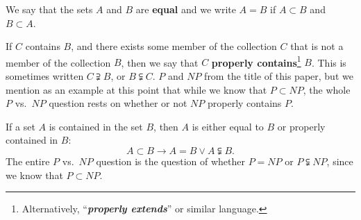 \documentclass[letterpaper]{article}
\begin{document}
\begin{definition}\label{def-eq}
	We say that the sets $A$ and $B$ are \textbf{equal} and we write $A=B$ if $A\subset B$ and $B\subset A$.
\end{definition}
\begin{definition}
	If $C$ contains $B$, and there exists some member of the collection $C$ that is not a member of the collection $B$, then we say that $C$ \textbf{properly contains}\footnote{Alternatively, ``\textbf{\textit{properly extends}}'' or similar language.} $B$.  This is sometimes written \mbox{$C\supsetneqq B$}, or \mbox{$B\subsetneqq C$}.  $P$ and $NP$ from the title of this paper, but we mention as an example at this point that while we know that $P\subset NP$, the whole $P$ vs.\ $NP$ question rests on whether or not $NP$ properly contains $P$.
\end{definition}
\begin{remark}
	If a set $A$ is contained in the set $B$, then $A$ is either equal to $B$ or properly contained in $B$:
	\begin{equation}
	A\subset B\longrightarrow A=B\lor A\subsetneqq B.
	\end{equation}
	The entire $P$ vs.\ $NP$ question is the question of whether \mbox{$P=NP$} or \mbox{$P\subsetneqq NP$}, since we know that \mbox{$P\subset NP$}. 
\end{remark}
\end{document}
